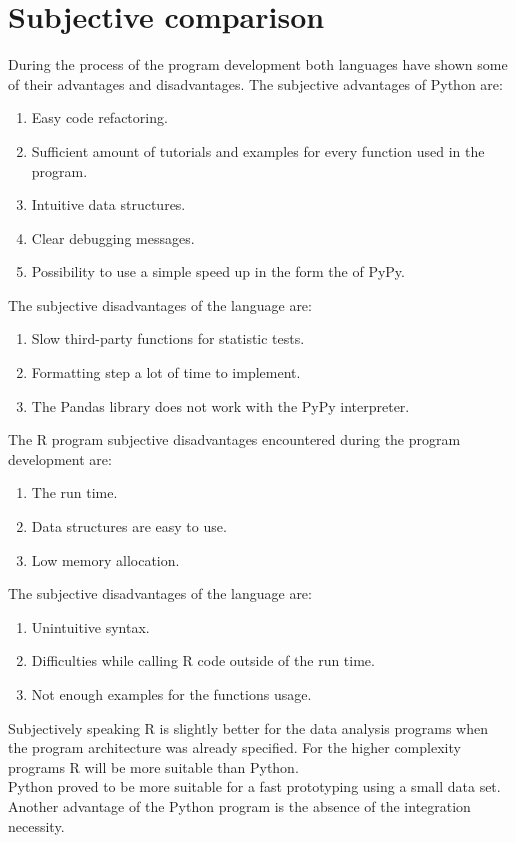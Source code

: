 \documentclass[
  twoside,
  11pt, a4paper,
  footinclude=true,
  headinclude=true,
  cleardoublepage=empty
]{scrreprt}
\begin{document}
    \section{Subjective comparison}
    During the process of the program development both languages have shown some of their advantages and disadvantages. The subjective advantages of  Python are:
    \begin{enumerate}
        \item Easy code refactoring.
        \item Sufficient amount of tutorials and examples for every function used in the program.
        \item Intuitive data structures.
        \item Clear debugging messages.
        \item Possibility to use a simple speed up in the form the of PyPy.
    \end{enumerate}
    The subjective disadvantages of the language are:
    \begin{enumerate}
        \item Slow third-party functions for statistic tests.
        \item Formatting step a lot of time to implement.
        \item The Pandas library does not work with the PyPy interpreter.
    \end{enumerate} 
    The R program subjective disadvantages encountered during the program development are:
    \begin{enumerate}
        \item The run time.
        \item Data structures are easy to use.
        \item Low memory allocation.
    \end{enumerate}
    The subjective disadvantages of the language are:
    \begin{enumerate}
        \item Unintuitive syntax.
        \item Difficulties while calling R code outside of the run time.
        \item Not enough examples for the functions usage.
    \end{enumerate} 
    Subjectively speaking R is slightly better for the data analysis programs when the program architecture was already specified. For the higher complexity programs R will be more suitable than Python.\\ 
    Python proved to be more suitable for a fast prototyping using a small data set. Another advantage of the Python program is the absence of the integration necessity.
      
\end{document}
